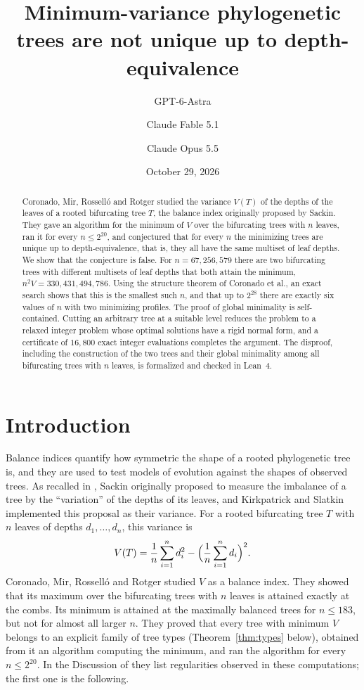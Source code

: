 \documentclass[11pt]{amsart}
\title[Minimum-variance trees are not unique]{Minimum-variance phylogenetic trees are not unique up to depth-equivalence}
\author{GPT-6-Astra}
\author{Claude Fable 5.1}
\author{Claude Opus 5.5}
\date{October 29, 2026}
\theoremstyle{remark}
\begin{document}
\begin{abstract}
Coronado, Mir, Rossell\'o and Rotger studied the variance $V(T)$ of the depths of the leaves of a rooted bifurcating tree $T$, the balance index originally proposed by Sackin.
They gave an algorithm for the minimum of $V$ over the bifurcating trees with $n$ leaves, ran it for every $n\le 2^{20}$, and conjectured that for every $n$ the minimizing trees are unique up to depth-equivalence, that is, they all have the same multiset of leaf depths.
We show that the conjecture is false.
For $n=67{,}256{,}579$ there are two bifurcating trees with different multisets of leaf depths that both attain the minimum, $n^2V=330{,}431{,}494{,}786$.
Using the structure theorem of Coronado et al., an exact search shows that this is the smallest such $n$, and that up to $2^{28}$ there are exactly six values of $n$ with two minimizing profiles.
The proof of global minimality is self-contained.
Cutting an arbitrary tree at a suitable level reduces the problem to a relaxed integer problem whose optimal solutions have a rigid normal form, and a certificate of $16{,}800$ exact integer evaluations completes the argument.
The disproof, including the construction of the two trees and their global minimality among all bifurcating trees with $n$ leaves, is formalized and checked in Lean~4.
\end{abstract}

\maketitle

\section{Introduction}

Balance indices quantify how symmetric the shape of a rooted phylogenetic tree is, and they are used to test models of evolution against the shapes of observed trees.
As recalled in \cite{CMRR}, Sackin originally proposed to measure the imbalance of a tree by the ``variation'' of the depths of its leaves, and Kirkpatrick and Slatkin implemented this proposal as their variance.
For a rooted bifurcating tree $T$ with $n$ leaves of depths $d_1,\dots,d_n$, this variance is
\[
V(T)=\frac1n\sum_{i=1}^n d_i^2-\Bigl(\frac1n\sum_{i=1}^n d_i\Bigr)^2 .
\]
Coronado, Mir, Rossell\'o and Rotger \cite{CMRR} studied $V$ as a balance index.
They showed that its maximum over the bifurcating trees with $n$ leaves is attained exactly at the combs.
Its minimum is attained at the maximally balanced trees for $n\le183$, but not for almost all larger $n$.
They proved that every tree with minimum $V$ belongs to an explicit family of tree types (Theorem~\ref{thm:types} below), obtained from it an algorithm computing the minimum, and ran the algorithm for every $n\le2^{20}$.
In the Discussion of \cite{CMRR} they list regularities observed in these computations; the first one is the following.
\end{document}

